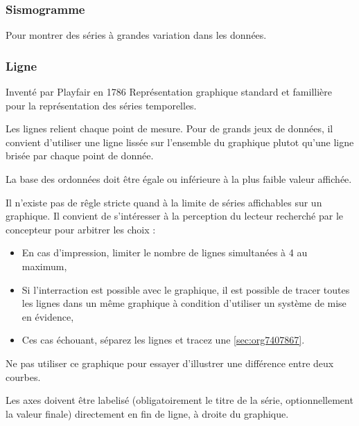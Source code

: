 \documentclass[a4paper,12pt]{article}
\begin{document}
\begin{multicols}{2}
\subsubsection{Sismogramme}
\label{sec:org9dfe307}
Pour montrer des séries à grandes variation dans les données. \autocite{alansmithLexiqueVisuel}
\subsubsection{Ligne}
\label{sec:org2bcc217}
Inventé par Playfair en 1786 \autocite{sosulskiBecomingVisual2019}
Représentation graphique standard et famillière pour la représentation des séries temporelles. \autocite[,@Schwabish2021p86]{alansmithLexiqueVisuel}

Les lignes relient chaque point de mesure. Pour de grands jeux de données, il convient d'utiliser une ligne lissée sur l'ensemble du graphique plutot qu'une ligne brisée par chaque point de donnée. \autocite{wilkeDirectoryVisualizations2019}

La base des ordonnées doit être égale ou inférieure à la plus faible valeur affichée. \autocite{wongWallStreetJournal2010}

Il n'existe pas de rêgle stricte quand à la limite de séries affichables sur un graphique.\autocite{jonathanschwabishTime2021} Il convient de s'intéresser à la perception du lecteur recherché par le concepteur pour arbitrer les choix : \autocite{jonathanschwabishTime2021}
\begin{itemize}
\item En cas d'impression, limiter le nombre de lignes simultanées à 4 au maximum, \autocite{wongWallStreetJournal2010}
\item Si l'interraction est possible avec le graphique, il est possible de tracer toutes les lignes dans un même graphique à condition d'utiliser un système de mise en évidence,\autocite{jonathanschwabishTime2021}
\item Ces cas échouant, séparez les lignes et tracez une \ref{sec:org7407867}.
\end{itemize}

Ne pas utiliser ce graphique pour essayer d'illustrer une différence entre deux courbes. \autocite{jonathanschwabishTime2021}

Les axes doivent être labelisé (obligatoirement le titre de la série, optionnellement la valeur finale) directement en fin de ligne, à droite du graphique. \autocite{andreaskrauseBestPracticesData2024,sosulskiGraphics2019}


\end{multicols}
\end{document}
